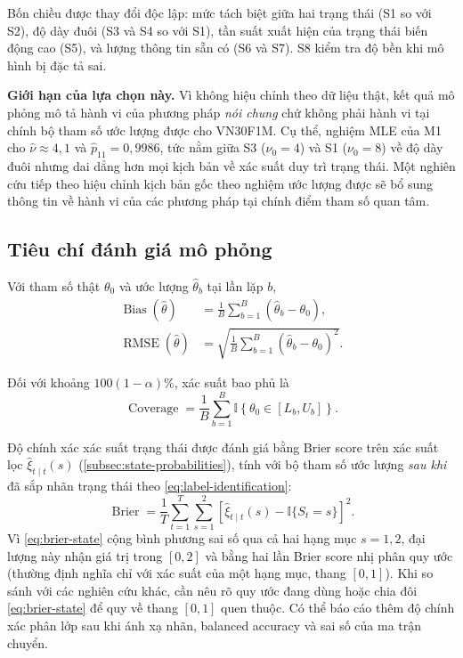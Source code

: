 \documentclass[12pt,a4paper]{article}
\numberwithin{equation}{section}
\newcommand{\RMSE}{\operatorname{RMSE}}
\newcommand{\ind}{\mathbb{I}}
\begin{document}
Bốn chiều được thay đổi độc lập: mức tách biệt giữa hai trạng thái (S1 so với S2), độ dày đuôi (S3 và S4 so với S1), tần suất xuất hiện của trạng thái biến động cao (S5), và lượng thông tin sẵn có (S6 và S7). S8 kiểm tra độ bền khi mô hình bị đặc tả sai.

\textbf{Giới hạn của lựa chọn này.} Vì không hiệu chỉnh theo dữ liệu thật, kết quả mô phỏng mô tả hành vi của phương pháp \emph{nói chung} chứ không phải hành vi tại chính bộ tham số ước lượng được cho VN30F1M. Cụ thể, nghiệm MLE của M1 cho $\hat\nu \approx 4{,}1$ và $\hat p_{11} = 0{,}9986$, tức nằm giữa S3 ($\nu_0 = 4$) và S1 ($\nu_0 = 8$) về độ dày đuôi nhưng dai dẳng hơn mọi kịch bản về xác suất duy trì trạng thái. Một nghiên cứu tiếp theo hiệu chỉnh kịch bản gốc theo nghiệm ước lượng được sẽ bổ sung thông tin về hành vi của các phương pháp tại chính điểm tham số quan tâm.

\subsection{Tiêu chí đánh giá mô phỏng}\label{subsec:simulation-metrics}

Với tham số thật $\theta_0$ và ước lượng $\widehat\theta_b$ tại lần lặp $b$,
\begin{align}
  \operatorname{Bias}(\widehat\theta)
  &=
  \frac{1}{B}\sum_{b=1}^{B}(\widehat\theta_b-\theta_0),
  \label{eq:bias}\\
  \RMSE(\widehat\theta)
  &=
  \sqrt{\frac{1}{B}\sum_{b=1}^{B}(\widehat\theta_b-\theta_0)^2}.
  \label{eq:parameter-rmse}
\end{align}

Đối với khoảng $100(1-\alpha)\%$, xác suất bao phủ là
\begin{equation}
  \operatorname{Coverage}
  =
  \frac{1}{B}
  \sum_{b=1}^{B}
  \ind\!\left\{
    \theta_0\in[L_b,U_b]
  \right\}.
  \label{eq:coverage}
\end{equation}

Độ chính xác xác suất trạng thái được đánh giá bằng Brier score trên xác suất lọc $\widehat\xi_{t\mid t}(s)$ (\cref{subsec:state-probabilities}), tính với bộ tham số ước lượng \emph{sau khi} đã sắp nhãn trạng thái theo \cref{eq:label-identification}:
\begin{equation}
  \operatorname{Brier}
  =
  \frac{1}{T}
  \sum_{t=1}^{T}
  \sum_{s=1}^{2}
  \left[
    \widehat\xi_{t\mid t}(s)-\ind\{S_t=s\}
  \right]^2.
  \label{eq:brier-state}
\end{equation}
Vì \cref{eq:brier-state} cộng bình phương sai số qua cả hai hạng mục $s=1,2$, đại lượng này nhận giá trị trong $[0,2]$ và bằng hai lần Brier score nhị phân quy ước (thường định nghĩa chỉ với xác suất của một hạng mục, thang $[0,1]$). Khi so sánh với các nghiên cứu khác, cần nêu rõ quy ước đang dùng hoặc chia đôi \cref{eq:brier-state} để quy về thang $[0,1]$ quen thuộc. Có thể báo cáo thêm độ chính xác phân lớp sau khi ánh xạ nhãn, balanced accuracy và sai số của ma trận chuyển.
\end{document}
